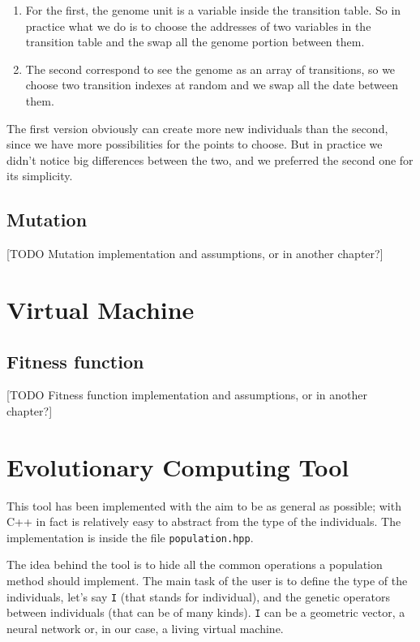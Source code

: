 \documentclass{report}
\begin{document}
\begin{enumerate}
\item For the first, the genome unit is a variable inside the transition table. So in practice what we do is to choose the addresses of two variables in the transition table and the swap all the genome portion between them.
\item The second correspond to see the genome as an array of transitions, so we choose two transition indexes at random and we swap all the date between them.
\end{enumerate}

The first version obviously can create more new individuals than the second, since we have more possibilities for the points to choose. But in practice we didn't notice big differences between the two, and we preferred the second one for its simplicity.

\subsection{Mutation}
\label{sec:mutation}
[TODO Mutation implementation and assumptions, or in another chapter?]


\section{Virtual Machine}

\subsection{Fitness function}
\label{sec:fitness}
[TODO Fitness function implementation and assumptions, or in another chapter?]



\section{Evolutionary Computing Tool}
This tool has been implemented with the aim to be as general as possible; with C++ in fact is relatively easy to abstract from the type of the individuals. The implementation is inside the file \texttt{population.hpp}.

The idea behind the tool is to hide all the common operations a population method should implement. The main task of the user is to define the type of the individuals, let's say \texttt{I} (that stands for individual), and the genetic operators between individuals (that can be of many kinds). \texttt{I} can be a geometric vector, a neural network or, in our case, a living virtual machine.
\end{document}
